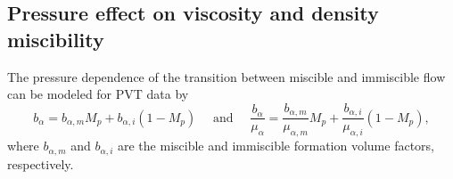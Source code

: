 \documentclass[11pt, a4paper]{article}
\begin{document}
\subsection*{Pressure effect on viscosity and density miscibility}

The pressure dependence of the transition between miscible and immiscible flow can be modeled for
PVT data by
\begin{equation*}
  b_\alpha = b_{\alpha,m} M_p + b_{\alpha,i}(1-M_p) \quad  \text{ and } \quad
  \frac{b_\alpha}{\mu_\alpha} = \frac{b_{\alpha,m}}{\mu_{\alpha,m}} M_p + \frac{b_{\alpha,i}}{\mu_{\alpha,i}}(1-M_p),
\end{equation*}
where $b_{\alpha,m}$ and $b_{\alpha,i}$ are the miscible and immiscible formation volume factors,
respectively. 


\begin{small}
  
\end{small}
\end{document}
